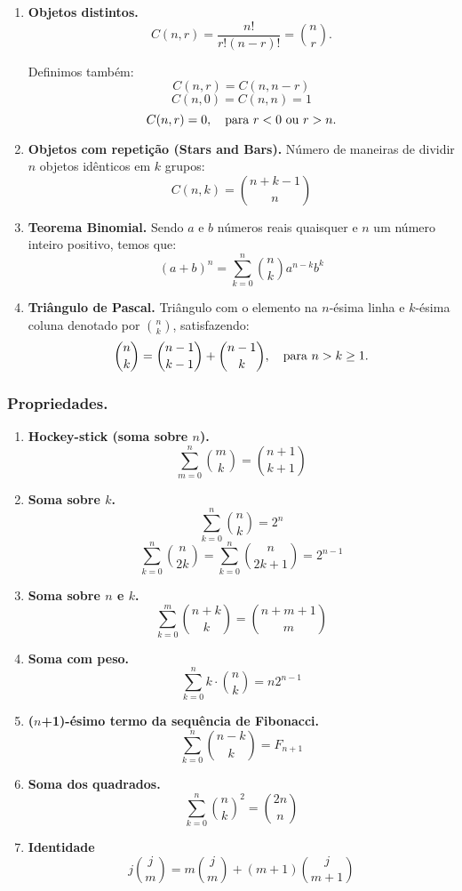 \begin{enumerate}
    \item \textbf{Objetos distintos.} 
    $$C(n,r) = \frac{n!}{r!(n - r)!} = \binom{n}{r}.$$

    Definimos também:
    $$C(n,r) = C(n, n-r)$$
    $$C(n,0) = C(n,n) = 1$$
    $$C(n,r) = 0, \quad \textnormal{para } r < 0 \textnormal{ ou } r > n.$$

    \item \textbf{Objetos com repetição (Stars and Bars).} Número de maneiras de dividir $n$ objetos idênticos em $k$ grupos:
    $$C(n,k) = \binom{n+k-1}{n}$$

	\item \textbf{Teorema Binomial.} Sendo $a$ e $b$ números reais quaisquer e $n$ um número inteiro positivo, temos que:
	$$(a+b)^n = \sum_{k=0}^{n} \binom{n}{k}a^{n-k}b^{k}$$

    \item \textbf{Triângulo de Pascal.} Triângulo com o elemento na $n$-ésima linha e $k$-ésima coluna denotado por $\binom{n}{k}$, satisfazendo:
    $$\binom{n}{k} = \binom{n-1}{k-1} + \binom{n-1}{k}, \quad \textnormal{para } n > k \ge 1.$$
    
	\end{enumerate}

\subsubsection*{Propriedades.}
\begin{multicols}{2}
    \begin{enumerate}
        \item \textbf{Hockey-stick (soma sobre $n$).}
        $$\sum_{m = 0}^{n} \binom{m}{k} = \binom{n+1}{k+1}$$

        \item \textbf{Soma sobre $k$.}
        $$\sum_{k = 0}^{n} \binom{n}{k} = 2^n$$
        $$\sum_{k = 0}^{n} \binom{n}{2k} = \sum_{k = 0}^{n} \binom{n}{2k+1} = 2^{n-1}$$

        \item \textbf{Soma sobre $n$ e $k$.}
        $$\sum_{k=0}^{m} \binom{n+k}{k} = \binom{n+m+1}{m}$$

        \item \textbf{Soma com peso.}
        $$\sum_{k=0}^{n} k\cdot \binom{n}{k} = n2^{n-1}$$

        \item \textbf{($n$+1)-ésimo termo da sequência de Fibonacci.}
        $$\sum_{k = 0}^{n} \binom{n-k}{k} = F_{n+1}$$

        \item \textbf{Soma dos quadrados.}
        $$\sum_{k = 0}^{n} \binom{n}{k}^2 = \binom{2n}{n}$$

  		\item \textbf{Identidade}
  		$$j \binom{j}{m} = m \binom{j}{m} + (m+1) \binom{j}{m+1}$$
    \end{enumerate}
\end{multicols}
 
